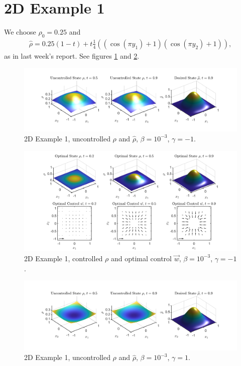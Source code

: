 \documentclass[11pt, a4paper]{article}
\theoremstyle{definition}
\begin{document}
\section{2D Example 1}
We choose $\rho_0 = 0.25$ and
\begin{align*}
\hat \rho = 0.25(1-t) + t\frac{1}{4}((\cos(\pi y_1)+1)(\cos(\pi y_2)+1)),  
\end{align*}
as in last week's report. See figures \ref{rhoHat2d1a} and \ref{rhoOpt2d1a}.
\begin{figure}[h]
	\includegraphics[scale=0.3]{Res1a.png}
	\caption{2D Example 1, uncontrolled $\rho$ and $\widehat \rho$, $\beta = 10^{-3}$, $\gamma = -1$.}
	\label{rhoHat2d1a}
\end{figure}
\begin{figure}[h]
	\includegraphics[scale=0.3]{Res2a.png}
	\caption{2D Example 1, controlled $\rho$ and optimal control $\vec{w}$, $\beta = 10^{-3}$, $\gamma = -1$.}
	\label{rhoOpt2d1a}
\end{figure}
\begin{figure}[h]
	\includegraphics[scale=0.3]{Res1b.png}
	\caption{2D Example 1, uncontrolled $\rho$ and $\widehat \rho$, $\beta = 10^{-3}$, $\gamma = 1$.}
	\label{rhoHat2d1b}
\end{figure}
\end{document}
